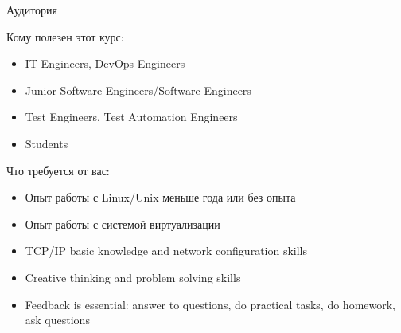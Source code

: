 \begin{frame}{Аудитория}

Кому полезен этот курс:
\begin{itemize}
    \item IT Engineers, DevOps Engineers
    \item Junior Software Engineers/Software Engineers
    \item Test Engineers, Test Automation Engineers
    \item Students
\end{itemize}
    \pause
Что требуется от вас:
\begin{itemize}
    \item Опыт работы с Linux/Unix меньше года или без опыта
    \pause
    \item Опыт работы с системой виртуализации
    \item TCP/IP basic knowledge and network configuration skills
    \item Creative thinking and problem solving skills
    \pause
    \item \alert{Feedback is essential: answer to questions, do practical tasks, do homework, ask questions}
\end{itemize}
\end{frame}
